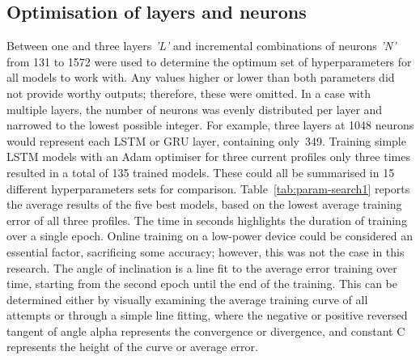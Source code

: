 %
%

\subsection{Optimisation of layers and neurons}
%
Between one and three layers \textit{'L'} and incremental combinations of neurons \textit{'N'} from 131 to 1572 were used to determine the optimum set of hyperparameters for all models to work with.
Any values higher or lower than both parameters did not provide worthy outputs; therefore, these were omitted.
In a case with multiple layers, the number of neurons was evenly distributed per layer and narrowed to the lowest possible integer.
For example, three layers at 1048 neurons would represent each LSTM or GRU layer, containing only~349.
Training simple LSTM models with an Adam optimiser for three current profiles only three times  resulted in a total of 135 trained models.
These could all be summarised in 15 different hyperparameters sets for comparison.
\mbox{Table~\ref{tab:param-search1}} reports the average results of the five best models, based on the lowest average training error of all three profiles.
The time in seconds highlights the duration of training over a single epoch.
Online training on a low-power device could be considered an essential factor, sacrificing some accuracy; however, this was not the case in this research.
The angle of inclination is a line fit to the average error training over time, starting from the second epoch until the end of the training.
This can be determined either by visually examining the average training curve of all attempts or through a simple line fitting, where the negative or positive reversed tangent of angle alpha represents the convergence or divergence, and constant C represents the height of the curve or average error.
